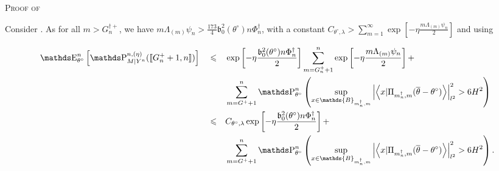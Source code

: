 \begin{pro}{\textsc{Proof of } \\}

Consider .
As for all $m > G^{\dagger +}_{n}$, we have $m \Lambda_{(m)} \psi_{n} > \frac{173}{4} \mathfrak{b}_{0}^{2}(\theta^{\circ}) n \Phi^{\dagger}_{n}$, with a constant $C_{\theta^{\circ}, \lambda} > \sum\limits_{m = 1}^{\infty} \exp \left[- \eta \frac{m \Lambda_{(m)} \psi_{n}}{2}\right]$ and using 

\begin{alignat*}{3}
& \E_{\theta^{\circ}}^{n}\left[\P_{M \vert Y^{n}}^{n, (\eta)}(\llbracket G^{+}_{n} + 1, n \rrbracket )\right] && \leq && \exp \left[- \eta \frac{\mathfrak{b}_{0}^{2}(\theta^{\circ}) n \Phi^{\dagger}_{n}}{2}\right] \sum\limits_{m = G^{+}_{n} + 1}^{n} \exp \left[- \eta \frac{m \Lambda_{(m)} \psi_{n}}{2}\right] +\\
& && && \sum\limits_{m = G^{+} + 1}^{n} \P_{\theta^{\circ}}^{n}\left(\sup\limits_{x \in \mathds{B}_{m^{\dagger}_{n}, m}} \left\vert \left\langle x \vert \Pi_{m^{\dagger}_{n}, m} (\overline{\theta} - \theta^{\circ}) \right\rangle \right\vert_{l^{2}}^{2} > 6H^{2}\right)\\
& && \leq && C_{\theta^{\circ}, \lambda} \exp \left[- \eta \frac{\mathfrak{b}_{0}^{2}(\theta^{\circ}) n \Phi^{\dagger}_{n}}{2}\right] +\\
& && && \sum\limits_{m = G^{+} + 1}^{n} \P_{\theta^{\circ}}^{n}\left(\sup\limits_{x \in \mathds{B}_{m^{\dagger}_{n}, m}} \left\vert \left\langle x \vert \Pi_{m^{\dagger}_{n}, m} (\overline{\theta} - \theta^{\circ}) \right\rangle \right\vert_{l^{2}}^{2} > 6H^{2}\right).
\end{alignat*}


\end{pro}
